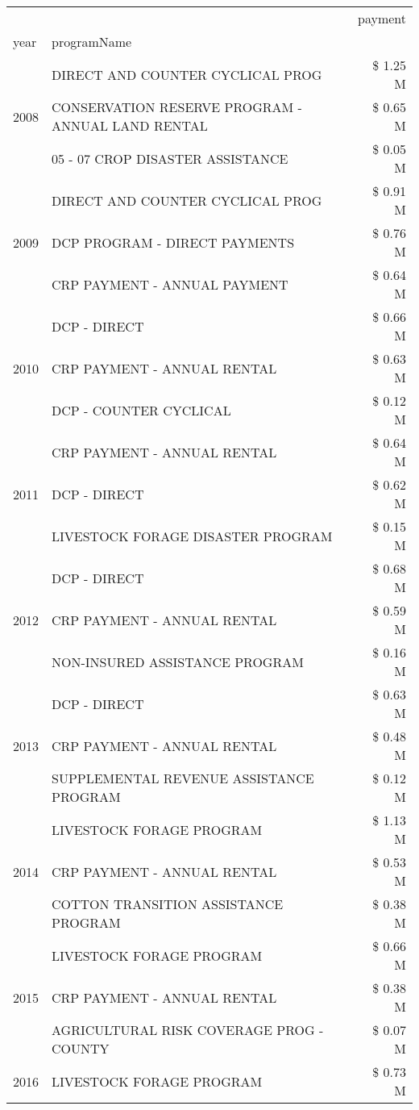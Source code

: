 \begin{tabular}{llr}
\toprule
 &  & payment \\
year & programName &  \\
\midrule
\multirow[t]{3}{*}{2008} & DIRECT AND COUNTER CYCLICAL PROG & \$ 1.25 M \\
 & CONSERVATION RESERVE PROGRAM - ANNUAL LAND RENTAL & \$ 0.65 M \\
 & 05 - 07 CROP DISASTER ASSISTANCE & \$ 0.05 M \\
\cline{1-3}
\multirow[t]{3}{*}{2009} & DIRECT AND COUNTER CYCLICAL PROG & \$ 0.91 M \\
 & DCP PROGRAM - DIRECT PAYMENTS & \$ 0.76 M \\
 & CRP PAYMENT - ANNUAL PAYMENT & \$ 0.64 M \\
\cline{1-3}
\multirow[t]{3}{*}{2010} & DCP - DIRECT & \$ 0.66 M \\
 & CRP PAYMENT - ANNUAL RENTAL & \$ 0.63 M \\
 & DCP - COUNTER CYCLICAL & \$ 0.12 M \\
\cline{1-3}
\multirow[t]{3}{*}{2011} & CRP PAYMENT - ANNUAL RENTAL & \$ 0.64 M \\
 & DCP - DIRECT & \$ 0.62 M \\
 & LIVESTOCK FORAGE DISASTER PROGRAM & \$ 0.15 M \\
\cline{1-3}
\multirow[t]{3}{*}{2012} & DCP - DIRECT & \$ 0.68 M \\
 & CRP PAYMENT - ANNUAL RENTAL & \$ 0.59 M \\
 & NON-INSURED ASSISTANCE PROGRAM & \$ 0.16 M \\
\cline{1-3}
\multirow[t]{3}{*}{2013} & DCP - DIRECT & \$ 0.63 M \\
 & CRP PAYMENT - ANNUAL RENTAL & \$ 0.48 M \\
 & SUPPLEMENTAL REVENUE ASSISTANCE PROGRAM & \$ 0.12 M \\
\cline{1-3}
\multirow[t]{3}{*}{2014} & LIVESTOCK FORAGE PROGRAM & \$ 1.13 M \\
 & CRP PAYMENT - ANNUAL RENTAL & \$ 0.53 M \\
 & COTTON TRANSITION ASSISTANCE PROGRAM & \$ 0.38 M \\
\cline{1-3}
\multirow[t]{3}{*}{2015} & LIVESTOCK FORAGE PROGRAM & \$ 0.66 M \\
 & CRP PAYMENT - ANNUAL RENTAL & \$ 0.38 M \\
 & AGRICULTURAL RISK COVERAGE PROG - COUNTY & \$ 0.07 M \\
\cline{1-3}
\multirow[t]{3}{*}{2016} & LIVESTOCK FORAGE PROGRAM & \$ 0.73 M \\

\end{tabular}
